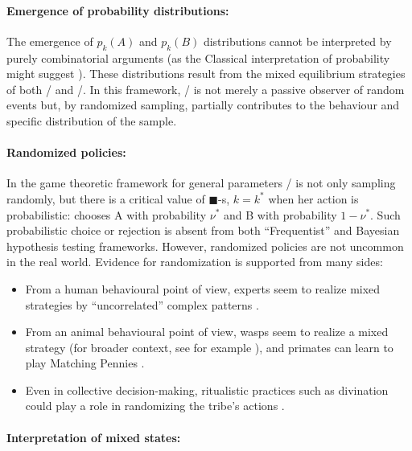 \documentclass{article}
\newcommand{\bb}{\blacksquare}
\theoremstyle{definition}
\begin{document}
\paragraph{Emergence of probability distributions:}

The emergence of $p_k(A)$ and $p_k(B)$ distributions cannot be interpreted by purely combinatorial arguments (as the Classical interpretation of probability might suggest \cite{sep:InterpretationOfProbability,book:Laplace}).
These distributions result from the mixed equilibrium strategies of both \PI/ and \PII/.
In this framework, \PI/ is not merely a passive observer of random events but, by randomized sampling, partially contributes to the behaviour and specific distribution of the sample.

\paragraph{Randomized policies:}

In the game theoretic framework for general parameters \PI/ is not only sampling randomly, but there is a critical value of $\bb$-s, $k=k^*$ when her action is probabilistic: chooses A with probability $\nu^*$ and B with probability $1-\nu^*$.
Such probabilistic choice or rejection is absent from both ``Frequentist'' and Bayesian hypothesis testing frameworks.
However, randomized policies are not uncommon in the real world. Evidence for randomization is supported from many sides:
    \begin{itemize}
        \item From a human behavioural point of view, experts seem to realize mixed strategies by ``uncorrelated'' complex patterns \cite{MinimaxExperiment01,MinimaxExperiment02}.
        \item From an animal behavioural point of view, wasps seem to realize a mixed strategy \cite{WaspRandomArticle} (for broader context, see for example \cite{EvolutionGameBookJMSmith}), and primates can learn to play Matching Pennies \cite{PrimateRandomArticle}.
        \item Even in collective decision-making, ritualistic practices such as divination could play a role in randomizing the tribe's actions \cite{DivinationArticle}.
    \end{itemize}  

\paragraph{Interpretation of mixed states:}
\end{document}
